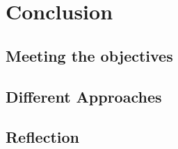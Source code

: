 \chapter{Conclusion}



\section{Meeting the objectives}



\section{Different Approaches}



\section{Reflection}

